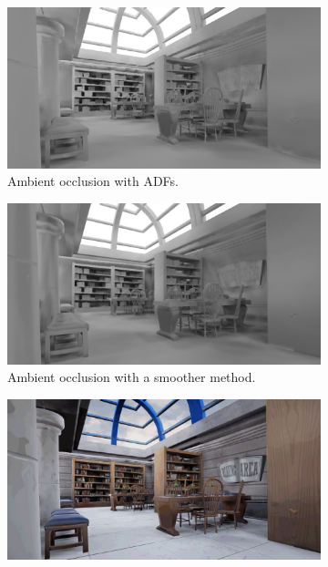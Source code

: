 \begin{figure}
	\begin{subfigure}[b]{0.5\textwidth}
		\includegraphics{graphics/df/DFAO_View_OldMethod}
		\caption{Ambient occlusion with ADFs.}
	\end{subfigure}
	\begin{subfigure}[b]{0.5\textwidth}
		\includegraphics{graphics/df/DFAO_View_NewMethod}
		\caption{Ambient occlusion with a smoother method.}
	\end{subfigure}
	\begin{subfigure}[b]{0.5\textwidth}
		\includegraphics{graphics/df/DFAO_Scene_OldMethod}

\end{subfigure}
\end{figure}
